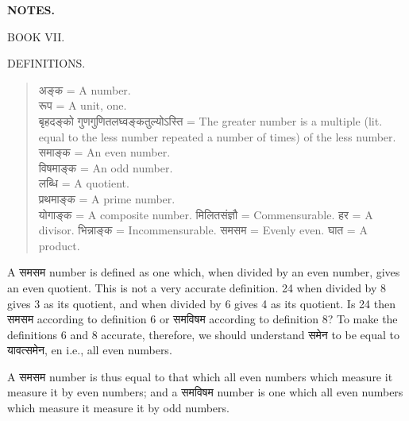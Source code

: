 \documentclass[11pt, openany]{book}
\begin{document}
\afterpage{\fancyhead[CE] {}}
\afterpage{\fancyhead[CO] {}}
\afterpage{\fancyhead[LE,RO]{\thepage}}
\cfoot{}

\newpage
\renewcommand{\thepage}{\Roman{page}}
\setcounter{page}{1}
\thispagestyle{empty}

\begin{center}
\textbf{NOTES.}\\
\vspace{5mm}

BOOK VII.\\
\vspace{3mm}

DEFINITIONS.
\end{center}
\vspace{3mm}

\begin{quote}
 अङ्क = {\en A number.}\\
 रूप = {\en A unit, one.}\\
 बृहदङ्को गुणगुणितलघ्वङ्कतुल्योऽस्ति = {\en The greater number is a multiple
(lit. equal to the less number repeated a number of times) of the less number.}\\
 समाङ्क = {\en An even number.}\\
 विषमाङ्क = {\en An odd number.}\\
 लब्धि = {\en A quotient.}\\
 प्रथमाङ्क = {\en A prime number.}\\
 योगाङ्क = {\en A composite number.}
 मिलितसंज्ञौ = {\en Commensurable.}
 हर = {\en A divisor.}
 भिन्नाङ्क = {\en Incommensurable.}
 समसम = {\en Evenly even.}
 घात = {\en A product.}
 \end{quote}

{\en A} समसम {\en number is defined as one which, when divided by an even number, gives an even quotient. This is not a very
accurate definition. 24 when divided by 8 gives 3 as its quotient, and when divided by 6 gives 4 as its quotient. Is 24
then} समसम {\en according to definition 6 or} समविषम {\en according to definition 8? To make the definitions 6 and 8 accurate, therefore, we should understand} समेन {\en to be equal to} यावत्समेन, {en i.e., all even numbers.}\\
\vspace{5mm}

{\en A} समसम {\en number is thus equal to that which all even
numbers which measure it measure it by even numbers; and
a} समविषम {\en number is one which all even numbers which
measure it measure it by odd numbers.}\\
\vspace{5mm}
\end{document}

